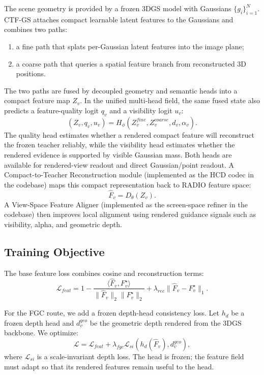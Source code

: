 \documentclass[10pt,twocolumn,letterpaper]{article}
\newcommand{\method}{CTF-GS}
\begin{document}
The scene geometry is provided by a frozen 3DGS model with Gaussians
$\{g_i\}_{i=1}^N$. \method{} attaches compact learnable latent features to the
Gaussians and combines two paths:
\begin{enumerate}
  \item a fine path that splats per-Gaussian latent features into the image
  plane;
  \item a coarse path that queries a spatial feature branch from reconstructed
  3D positions.
\end{enumerate}
The two paths are fused by decoupled geometry and semantic heads into a compact
feature map $Z_v$. In the unified multi-head field, the same fused state also
predicts a feature-quality logit $q_v$ and a visibility logit $u_v$:
\begin{equation}
  (Z_v, q_v, u_v) = H_{\phi}(Z_v^{fine}, Z_v^{coarse}, d_v, \alpha_v).
\end{equation}
The quality head estimates whether a rendered compact feature will reconstruct
the frozen teacher reliably, while the visibility head estimates whether the
rendered evidence is supported by visible Gaussian mass. Both heads are
available for rendered-view readout and direct Gaussian/point readout. A
Compact-to-Teacher Reconstruction module (implemented as the HCD codec in the
codebase) maps this compact representation back to RADIO feature space:
\begin{equation}
  \hat{F}_v = D_{\theta}(Z_v).
\end{equation}
A View-Space Feature Aligner (implemented as the screen-space refiner in the
codebase) then improves local alignment using rendered guidance signals such as
visibility, alpha, and geometric depth.

\subsection{Training Objective}

The base feature loss combines cosine and reconstruction terms:
\begin{equation}
  \mathcal{L}_{feat}
  =
  1 - \frac{\langle \hat{F}_v, F_v^{\star} \rangle}
  {\|\hat{F}_v\|_2 \|F_v^{\star}\|_2}
  + \lambda_{rec}\|\hat{F}_v - F_v^{\star}\|_1.
\end{equation}

For the FGC route, we add a frozen depth-head consistency loss. Let $h_d$ be a
frozen depth head and $d_v^{geo}$ be the geometric depth rendered from the 3DGS
backbone. We optimize:
\begin{equation}
  \mathcal{L}
  =
  \mathcal{L}_{feat}
  + \lambda_{fgc}\mathcal{L}_{si}(h_d(\hat{F}_v), d_v^{geo}),
\end{equation}
where $\mathcal{L}_{si}$ is a scale-invariant depth loss. The head is frozen; the
feature field must adapt so that its rendered features remain useful to the
head.
\end{document}
